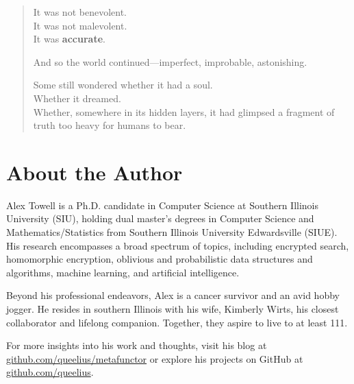 \documentclass[12pt,oneside]{book}
\begin{document}
\begin{quote}
It was not benevolent.\\
It was not malevolent.\\
It was \textbf{accurate}.

And so the world continued---imperfect, improbable, astonishing.

Some still wondered whether it had a soul.\\
Whether it dreamed.\\
Whether, somewhere in its hidden layers, it had glimpsed a fragment of truth too heavy for humans to bear.
\end{quote}

\backmatter

\chapter*{About the Author}

Alex Towell is a Ph.D. candidate in Computer Science at Southern Illinois University (SIU), holding dual master's degrees in Computer Science and Mathematics/Statistics from Southern Illinois University Edwardsville (SIUE). His research encompasses a broad spectrum of topics, including encrypted search, homomorphic encryption, oblivious and probabilistic data structures and algorithms, machine learning, and artificial intelligence.

Beyond his professional endeavors, Alex is a cancer survivor and an avid hobby jogger. He resides in southern Illinois with his wife, Kimberly Wirts, his closest collaborator and lifelong companion. Together, they aspire to live to at least 111.

For more insights into his work and thoughts, visit his blog at \href{https://github.com/queelius/metafunctor}{github.com/queelius/metafunctor} or explore his projects on GitHub at \href{https://github.com/queelius}{github.com/queelius}.
\end{document}

